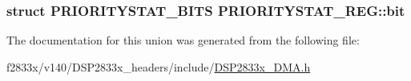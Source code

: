 \subsubsection[{bit}]{\setlength{\rightskip}{0pt plus 5cm}struct {\bf P\+R\+I\+O\+R\+I\+T\+Y\+S\+T\+A\+T\+\_\+\+B\+I\+T\+S} P\+R\+I\+O\+R\+I\+T\+Y\+S\+T\+A\+T\+\_\+\+R\+E\+G\+::bit}\label{union_p_r_i_o_r_i_t_y_s_t_a_t___r_e_g_af70e27b64ceb8473cfe9e47e0e172b45}


The documentation for this union was generated from the following file\+:\begin{DoxyCompactItemize}
\item 
f2833x/v140/\+D\+S\+P2833x\+\_\+headers/include/\hyperlink{_d_s_p2833x___d_m_a_8h}{D\+S\+P2833x\+\_\+\+D\+M\+A.\+h}\end{DoxyCompactItemize}
